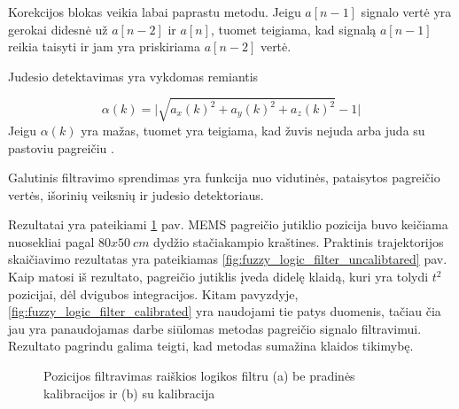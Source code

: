 Korekcijos blokas veikia labai paprastu metodu. Jeigu $a[n-1]$ signalo vertė yra gerokai didesnė už $a[n-2]$ ir $a[n]$, tuomet teigiama, kad signalą $a[n-1]$ reikia taisyti ir jam yra priskiriama $a[n-2]$ vertė.

Judesio detektavimas yra vykdomas remiantis

\begin{equation}
    \alpha(k) = \Big| \sqrt{a_x(k)^2 + a_y(k)^2 + a_z(k)^2} - 1\Big|
\end{equation}
Jeigu $\alpha(k)$ yra mažas, tuomet yra teigiama, kad žuvis nejuda arba juda su pastoviu pagreičiu \cite{yoo2011gain}.

Galutinis filtravimo sprendimas yra funkcija nuo vidutinės, pataisytos pagreičio vertės, išorinių veiksnių ir judesio detektoriaus.

Rezultatai yra pateikiami \ref{fig:fuzzy_logic_filter} pav. MEMS pagreičio jutiklio pozicija buvo keičiama nuosekliai pagal $80x50~cm$ dydžio stačiakampio kraštines. Praktinis trajektorijos skaičiavimo rezultatas yra pateikiamas \ref{fig:fuzzy_logic_filter_uncalibtared} pav. Kaip matosi iš rezultato, pagreičio jutiklis įveda didelę klaidą, kuri yra tolydi $t^2$ pozicijai, dėl dvigubos integracijos. Kitam pavyzdyje, \ref{fig:fuzzy_logic_filter_calibrated} yra naudojami tie patys duomenis, tačiau čia jau yra panaudojamas darbe siūlomas metodas pagreičio signalo filtravimui. Rezultato pagrindu galima teigti, kad metodas sumažina klaidos tikimybę.

\begin{figure}[H]
    \centering
    \caption{Pozicijos filtravimas raiškios logikos filtru (a) be pradinės kalibracijos ir (b) su kalibracija \cite{yoo2011fuzzy}}
    \label{fig:fuzzy_logic_filter}
\end{figure}

